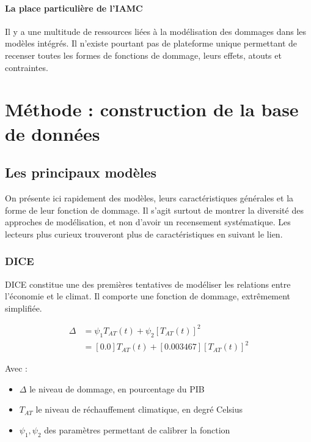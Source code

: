 \paragraph{La place particulière de l'IAMC}


Il y a une multitude de ressources liées à la modélisation des dommages dans les modèles intégrés. Il n'existe pourtant pas de plateforme unique permettant de recenser toutes les formes de fonctions de dommage, leurs effets, atouts et contraintes. 

\section{Méthode : construction de la base de données}



\subsection{Les principaux modèles}

On présente ici rapidement des modèles, leurs caractéristiques générales et la forme de leur fonction de dommage. Il s'agit surtout de montrer la diversité des approches de modélisation, et non d'avoir un recensement systématique. Les lecteurs plus curieux trouveront plus de caractéristiques en suivant le lien. 

\subsubsection{DICE}

\Gls{DICE} constitue une des premières tentatives de modéliser les relations entre l'économie et le climat. Il comporte une fonction de dommage, extrêmement simplifiée. 

\begin{equation}
\begin{array}{ll}
     \displaystyle  \Delta  & = \psi_{1}T_{AT}(t) + \psi_{2}[T_{AT}(t)]^{2} \\
    & = [0.0]T_{AT}(t) + [0.003467][T_{AT}(t)]^{2}
\end{array}
\label{eq:df_dice2023}
\end{equation}

Avec : 
\begin{itemize}
    \item $\Delta$ le niveau de dommage, en pourcentage du PIB
    \item $T_{AT}$ le niveau de réchauffement climatique, en degré Celsius
    \item $\psi_1, \psi_2$ des paramètres permettant de calibrer la fonction
\end{itemize}
\vspace{15pt}

